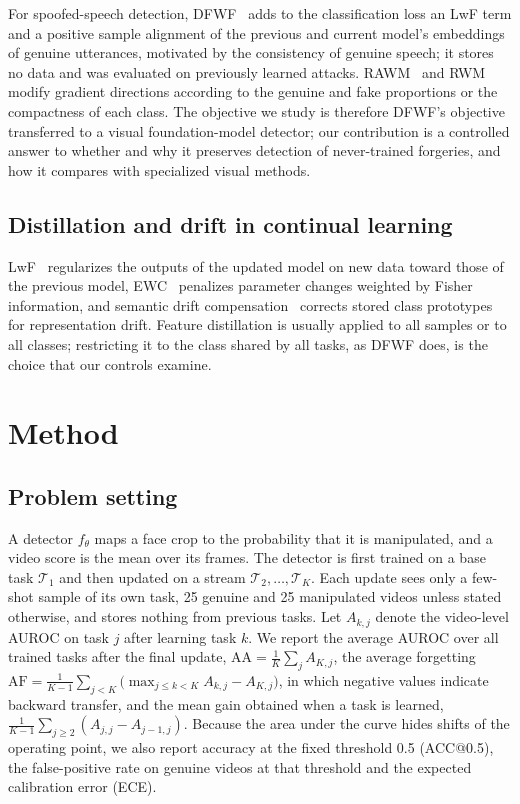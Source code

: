 \documentclass[journal]{IEEEtran}
\begin{document}
For spoofed-speech detection, DFWF~\cite{ma2021dfwf} adds to the classification loss an LwF term and a positive sample alignment of the previous and current model's embeddings of genuine utterances, motivated by the consistency of genuine speech; it stores no data and was evaluated on previously learned attacks. RAWM~\cite{zhang2023rawm} and RWM~\cite{zhang2024rwm} modify gradient directions according to the genuine and fake proportions or the compactness of each class. The objective we study is therefore DFWF's objective transferred to a visual foundation-model detector; our contribution is a controlled answer to whether and why it preserves detection of never-trained forgeries, and how it compares with specialized visual methods.

\subsection{Distillation and drift in continual learning}
LwF~\cite{li2018lwf} regularizes the outputs of the updated model on new data toward those of the previous model, EWC~\cite{kirkpatrick2017ewc} penalizes parameter changes weighted by Fisher information, and semantic drift compensation~\cite{yu2020sdc} corrects stored class prototypes for representation drift. Feature distillation is usually applied to all samples or to all classes; restricting it to the class shared by all tasks, as DFWF does, is the choice that our controls examine.

\section{Method}
\label{sec:method}

\subsection{Problem setting}
\label{sec:problem}

A detector $f_\theta$ maps a face crop to the probability that it is manipulated, and a video score is the mean over its frames. The detector is first trained on a base task $\mathcal{T}_1$ and then updated on a stream $\mathcal{T}_2,\dots,\mathcal{T}_K$. Each update sees only a few-shot sample of its own task, 25 genuine and 25 manipulated videos unless stated otherwise, and stores nothing from previous tasks. Let $A_{k,j}$ denote the video-level AUROC on task $j$ after learning task $k$. We report the average AUROC over all trained tasks after the final update, $\mathrm{AA}=\frac{1}{K}\sum_{j}A_{K,j}$, the average forgetting $\mathrm{AF}=\frac{1}{K-1}\sum_{j<K}\big(\max_{j\le k<K}A_{k,j}-A_{K,j}\big)$, in which negative values indicate backward transfer, and the mean gain obtained when a task is learned, $\frac{1}{K-1}\sum_{j\ge2}(A_{j,j}-A_{j-1,j})$. Because the area under the curve hides shifts of the operating point, we also report accuracy at the fixed threshold 0.5 (ACC@0.5), the false-positive rate on genuine videos at that threshold and the expected calibration error (ECE).
\end{document}
